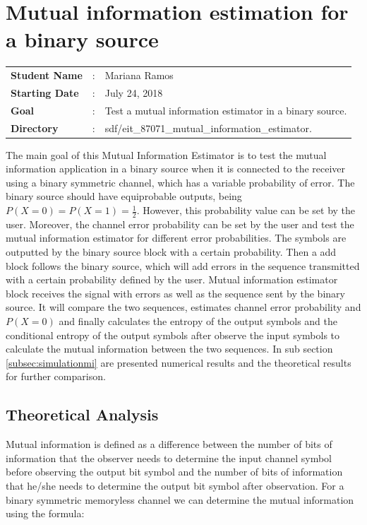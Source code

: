\clearpage
\section{Mutual information estimation for a binary source}

\begin{refsection}

\begin{tcolorbox}	
\begin{tabular}{p{2.75cm} p{0.2cm} p{10.5cm}} 	
\textbf{Student Name}  &:& Mariana Ramos\\
\textbf{Starting Date} &:& July 24, 2018\\
\textbf{Goal}          &:& Test a mutual information estimator in a binary source.\\
\textbf{Directory}     &:& sdf/eit\_87071\_mutual\_information\_estimator.
\end{tabular}
\end{tcolorbox}

The main goal of this Mutual Information Estimator is to test the mutual information application in a binary source when it is connected to the receiver using a binary symmetric channel, which has a variable probability of error. The binary source should have equiprobable outputs, being $P(X=0) = P(X=1) = \frac{1}{2}$. However, this probability value can be set by the user. Moreover, the channel error probability can be set by the user and test the mutual information estimator for different error probabilities. The symbols are outputted by the binary source block with a certain probability. Then a add block follows the binary source, which will add errors in the sequence transmitted with a certain probability defined by the user. Mutual information estimator block receives the signal with errors as well as the sequence sent by the binary source. It will compare the two sequences, estimates channel error probability and $P(X=0)$ and finally calculates the entropy of the output symbols and the conditional entropy of the output symbols after observe the input symbols to calculate the mutual information between the two sequences. In sub section \ref{subsec:simulationmi} are presented numerical results and the theoretical results for further comparison. 

\subsection{Theoretical Analysis}
Mutual information is defined as a difference between the number of bits of information that the observer needs to determine the input channel symbol before observing the output bit symbol and the number of bits of information that he/she needs to determine the output bit symbol after observation. For a binary symmetric memoryless channel we can determine the mutual information using the formula:


\end{refsection}
